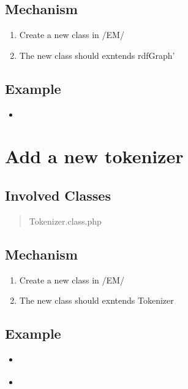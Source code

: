 \documentclass[letterpaper,10pt,english]{sphinxmanual}
\begin{document}
\subsection{Mechanism}
\label{docs/hooks/t_rdf_parser:mechanism}\begin{enumerate}
\item {} 
Create a new class in /EM/

\item {} 
The new class should exntends rdfGraph'

\end{enumerate}


\subsection{Example}
\label{docs/hooks/t_rdf_parser:example}\begin{itemize}
\item {} 
{\hyperref[docs/api:EasyRdfAdapter]{}}

\end{itemize}


\section{Add a new tokenizer}
\label{docs/hooks/t_tokenizer::doc}\label{docs/hooks/t_tokenizer:hook-template-uss}\label{docs/hooks/t_tokenizer:add-a-new-tokenizer}

\subsection{Involved Classes}
\label{docs/hooks/t_tokenizer:involved-classes}\begin{quote}

Tokenizer.class.php
\end{quote}


\subsection{Mechanism}
\label{docs/hooks/t_tokenizer:mechanism}\begin{enumerate}
\item {} 
Create a new class in /EM/

\item {} 
The new class should exntends Tokenizer

\end{enumerate}


\subsection{Example}
\label{docs/hooks/t_tokenizer:example}\begin{itemize}
\item {} 
{\hyperref[docs/api:CaseBasedTokenizer]{}}

\item {} 
{\hyperref[docs/api:DelimitBasedTokenizer]{}}

\end{itemize}
\end{document}
